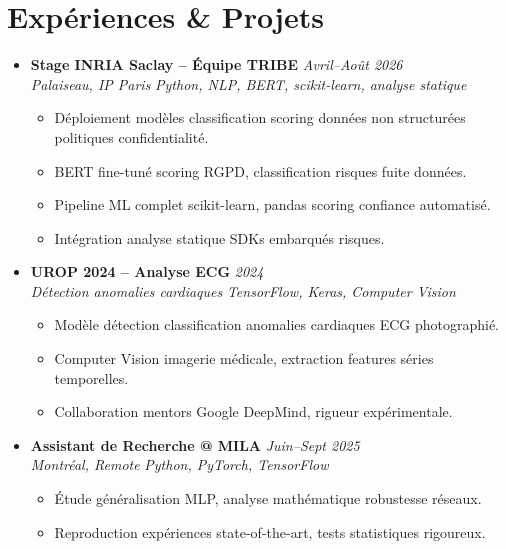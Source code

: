 \documentclass[a4paper,11pt]{article}
\begin{document}
\section{Exp\'eriences \& Projets}
\begin{itemize}[leftmargin=0.5cm, nosep]

    \item \textbf{Stage INRIA Saclay -- \'Equipe TRIBE} \hfill \textit{Avril--Ao\^ut 2026} \\
    \textit{Palaiseau, IP Paris} \hfill \textit{Python, NLP, BERT, scikit-learn, analyse statique}
    \vspace{-2pt}
    \begin{itemize}[leftmargin=0.4cm, nosep, label=\tiny$\bullet$]
        \item \small{D\'eploiement mod\`eles classification scoring donn\'ees non structur\'ees politiques confidentialit\'e.}
        \item \small{BERT fine-tun\'e scoring RGPD, classification risques fuite donn\'ees.}
        \item \small{Pipeline ML complet scikit-learn, pandas scoring confiance automatisé.}
        \item \small{Int\'egration analyse statique SDKs embarqu\'es risques.}
    \end{itemize}
    \vspace{3pt}

    \item \textbf{UROP 2024 -- Analyse ECG} \hfill \textit{2024} \\
    \textit{D\'etection anomalies cardiaques} \hfill \textit{TensorFlow, Keras, Computer Vision}
    \vspace{-2pt}
    \begin{itemize}[leftmargin=0.4cm, nosep, label=\tiny$\bullet$]
        \item \small{Mod\`ele d\'etection classification anomalies cardiaques ECG photographi\'e.}
        \item \small{Computer Vision imagerie m\'edicale, extraction features s\'eries temporelles.}
        \item \small{Collaboration mentors Google DeepMind, rigueur exp\'erimentale.}
    \end{itemize}
    \vspace{3pt}

    \item \textbf{Assistant de Recherche @ MILA} \hfill \textit{Juin--Sept 2025} \\
    \textit{Montr\'eal, Remote} \hfill \textit{Python, PyTorch, TensorFlow}
    \vspace{-2pt}
    \begin{itemize}[leftmargin=0.4cm, nosep, label=\tiny$\bullet$]
        \item \small{\'Etude g\'en\'eralisation MLP, analyse math\'ematique robustesse r\'eseaux.}
        \item \small{Reproduction exp\'eriences state-of-the-art, tests statistiques rigoureux.}
    \end{itemize}
    \vspace{3pt}


\end{itemize}
\end{document}
